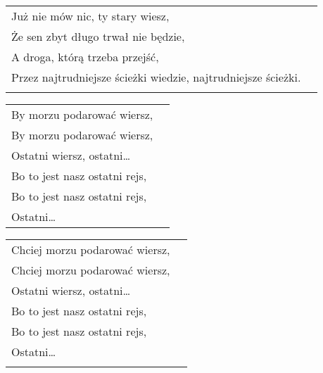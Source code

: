 \documentclass[a5paper]{article}
\begin{document}
\noindent
\begin{tabular}{@{}p{8.00cm}p{3cm}@{}}
Już nie mów nic, ty stary wiesz, \\
Że sen zbyt długo trwał nie będzie,	\\
A droga, którą trzeba przejść, \\
Przez najtrudniejsze ścieżki wiedzie, najtrudniejsze ścieżki.\\ \\
\end{tabular}

\noindent
\begin{tabular}{@{}p{8.00cm}p{3cm}@{}}
By morzu podarować wiersz, \\
By morzu podarować wiersz, \\
Ostatni wiersz, ostatni… \\
Bo to jest nasz ostatni rejs, \\
Bo to jest nasz ostatni rejs, \\
Ostatni…
\end{tabular}
\noindent
\begin{tabular}{@{}p{8.00cm}p{3cm}@{}}
Chciej morzu podarować wiersz, \\
Chciej morzu podarować wiersz, \\
Ostatni wiersz, ostatni… \\
Bo to jest nasz ostatni rejs, \\
Bo to jest nasz ostatni rejs, \\
Ostatni… \\ \\
\end{tabular}
\end{document}
